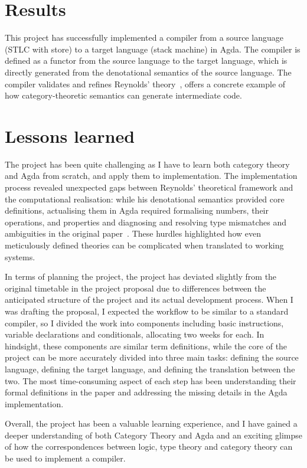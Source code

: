 \documentclass[12pt,a4paper]{report}
\theoremstyle{definition}
\begin{document}
    \section{Results}
    This project has successfully implemented a compiler from a source language (STLC with store) to a target language (stack machine) in Agda. The compiler is defined as a functor from the source language to the target language, which is directly generated from the denotational semantics of the source language. The compiler validates and refines Reynolds' theory~\autocite{Reynolds}, offers a concrete example of how category-theoretic semantics can generate intermediate code.

    \section{Lessons learned}
    The project has been quite challenging as I have to learn both category theory and Agda from scratch, and apply them to implementation. The implementation process revealed unexpected gaps between Reynolds' theoretical framework and the computational realisation: while his denotational semantics provided core definitions, actualising them in Agda required formalising numbers, their operations, and properties and diagnosing and resolving type mismatches and ambiguities in the original paper~\autocite{Reynolds}. These hurdles highlighted how even meticulously defined theories can be complicated when translated to working systems.


    In terms of planning the project, the project has deviated slightly from the original timetable in the project proposal due to differences
    between the anticipated structure of the project and its actual development process. When I was drafting the proposal, I expected the workflow to be similar to a standard compiler, so I divided the work into components including basic instructions, variable declarations and conditionals, allocating two weeks for each. In hindsight, these components are similar term definitions, while the core of the project can be more accurately divided into three main tasks: defining the source language, defining the target language, and defining the translation between the two. The most time-consuming aspect of each step has been understanding their formal definitions in the paper and addressing the missing details in the Agda implementation.

    Overall, the project has been a valuable learning experience, and I have gained a deeper understanding of both Category Theory and Agda and an exciting glimpse of how the correspondences between logic, type theory and category theory can be used to implement a compiler.
\end{document}
